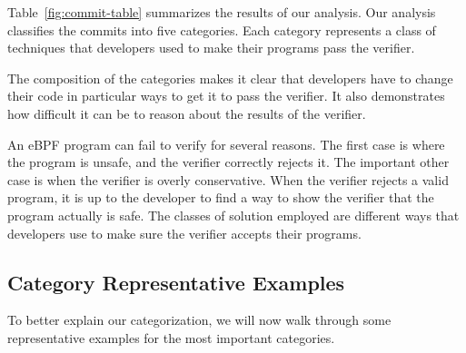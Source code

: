 Table~\ref{fig:commit-table} summarizes the results of our analysis.
Our analysis classifies the commits into five categories.
Each category represents a class of techniques that developers used to make their programs pass the verifier.


The composition of the categories makes it clear that developers have to change their code in particular ways to get it to pass the verifier.
It also demonstrates how difficult it can be to reason about the results of the verifier.

An eBPF program can fail to verify for several reasons.
The first case is where the program is unsafe, and the verifier correctly rejects it.
The important other case is when the verifier is overly conservative.
When the verifier rejects a valid program, it is up to the developer to find a way to show the verifier that the program actually is safe.
The classes of solution employed are different ways that developers use to make sure the verifier accepts their programs.

\subsection{Category Representative Examples}
To better explain our categorization, we will now walk through some representative examples for the most important categories.

